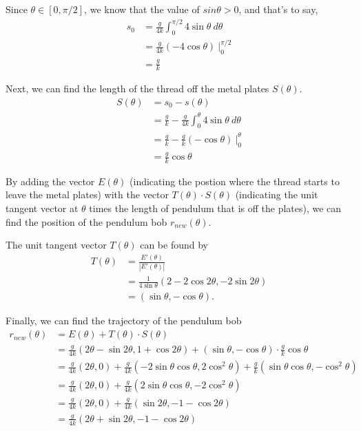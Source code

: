 \documentclass{article}
\begin{document}
	Since $\theta \in [0, \pi/2]$, we know that the value of $sin\theta > 0$, and that's to say,
	\begin{equation*}
		\begin{aligned}
		s_0 &= \frac{g}{4k} \int_0^{\pi/2} 4\sin\theta \ d\theta\\
			&= \frac{g}{4k} (-4\cos\theta) \ |_0^{\pi/2}\\
			&= \frac{g}{k}
		\end{aligned}
	\end{equation*}

	Next, we can find the length of the thread off the metal plates $S(\theta)$.
	\begin{equation*}
		\begin{aligned}
		S(\theta) &= s_0-s(\theta)\\
				  &= \frac{g}{k} - \frac{g}{4k} \int_0^{\theta}4 \sin\theta \ d\theta\\
				  &= \frac{g}{k} - \frac{g}{k} (-\cos\theta)\ |_0^{\theta} \\
				  &= \frac{g}{k} \cos \theta
		\end{aligned}
	\end{equation*}

	By adding the vector $E(\theta)$ (indicating the postion where the thread starts to leave the metal plates) with the vector $T(\theta)\cdot S(\theta)$ (indicating the unit tangent vector at $\theta$ times the length of pendulum that is off the plates), we can find the position of the pendulum bob $r_{new}(\theta)$.

	The unit tangent vector $T(\theta)$ can be found by
	\begin{equation*}
		\begin{aligned}
		T(\theta) &= \frac{E'(\theta)}{|E'(\theta)|} \\
				  &= \frac{1}{4\sin\theta} (2-2\cos 2\theta ,-2\sin 2\theta) \\
				  &= (\sin\theta, -\cos\theta).
		\end{aligned}
	\end{equation*}

	Finally, we can find the trajectory of the pendulum bob
	\begin{equation*}
		\begin{aligned}
		r_{new}(\theta) &= E(\theta) + T(\theta) \cdot S(\theta) \\
				  &= \frac{g}{4k}(2\theta -\sin 2\theta ,1+\cos 2\theta ) + (\sin\theta, -\cos\theta) \cdot \frac{g}{k} \cos \theta \\
				  &= \frac{g}{4k}(2\theta,0)+\frac{g}{4k}(-2\sin\theta \cos\theta,2\cos^2\theta)+\frac{g}{k}(\sin\theta \cos\theta,-\cos^2\theta) \\
				  &= \frac{g}{4k}(2\theta,0)+\frac{g}{4k}(2\sin\theta \cos\theta,-2\cos^2\theta) \\
				  &= \frac{g}{4k}(2\theta,0)+\frac{g}{4k}(\sin2\theta,-1-\cos 2\theta)\\
				  &= \frac{g}{4k}(2\theta+\sin2\theta,-1-\cos2\theta)
		\end{aligned}
	\end{equation*}
\end{document}
